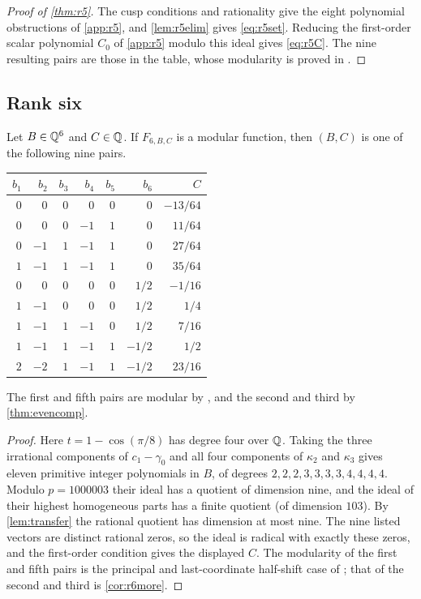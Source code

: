 \begin{proof}[Proof of \cref{thm:r5}]
The cusp conditions and rationality give the eight polynomial obstructions of \cref{app:r5}, and \cref{lem:r5elim} gives \eqref{eq:r5set}. Reducing the first-order scalar polynomial $C_0$ of \cref{app:r5} modulo this ideal gives \eqref{eq:r5C}. The nine resulting pairs are those in the table, whose modularity is proved in \cite[Theorem~5.2]{SW26}.
\end{proof}

\subsection{Rank six}

\begin{theorem}\label{thm:r6}
Let $B\in\mathbb{Q}^6$ and $C\in\mathbb{Q}$. If $F_{6,B,C}$ is a modular function, then $(B,C)$ is one of the following nine pairs.
\begin{center}
\begin{tabular}{rrrrrrr}
\toprule
$b_1$ & $b_2$ & $b_3$ & $b_4$ & $b_5$ & $b_6$ & $C$\\
\midrule
$0$ & $0$ & $0$ & $0$ & $0$ & $0$ & $-13/64$\\
$0$ & $0$ & $0$ & $-1$ & $1$ & $0$ & $11/64$\\
$0$ & $-1$ & $1$ & $-1$ & $1$ & $0$ & $27/64$\\
$1$ & $-1$ & $1$ & $-1$ & $1$ & $0$ & $35/64$\\
$0$ & $0$ & $0$ & $0$ & $0$ & $1/2$ & $-1/16$\\
$1$ & $-1$ & $0$ & $0$ & $0$ & $1/2$ & $1/4$\\
$1$ & $-1$ & $1$ & $-1$ & $0$ & $1/2$ & $7/16$\\
$1$ & $-1$ & $1$ & $-1$ & $1$ & $-1/2$ & $1/2$\\
$2$ & $-2$ & $1$ & $-1$ & $1$ & $-1/2$ & $23/16$\\
\bottomrule
\end{tabular}
\end{center}
The first and fifth pairs are modular by \cite{CTW26}, and the second and third by \cref{thm:evencomp}.
\end{theorem}

\begin{proof}
Here $t=1-\cos(\pi/8)$ has degree four over $\mathbb{Q}$. Taking the three irrational components of $c_1-\gamma_0$ and all four components of $\kappa_2$ and $\kappa_3$ gives eleven primitive integer polynomials in $B$, of degrees $2,2,2,3,3,3,3,4,4,4,4$. Modulo $p=1000003$ their ideal has a quotient of dimension nine, and the ideal of their highest homogeneous parts has a finite quotient (of dimension $103$). By \cref{lem:transfer} the rational quotient has dimension at most nine. The nine listed vectors are distinct rational zeros, so the ideal is radical with exactly these zeros, and the first-order condition gives the displayed $C$. The modularity of the first and fifth pairs is the principal and last-coordinate half-shift case of \cite{CTW26}; that of the second and third is \cref{cor:r6more}.
\end{proof}

